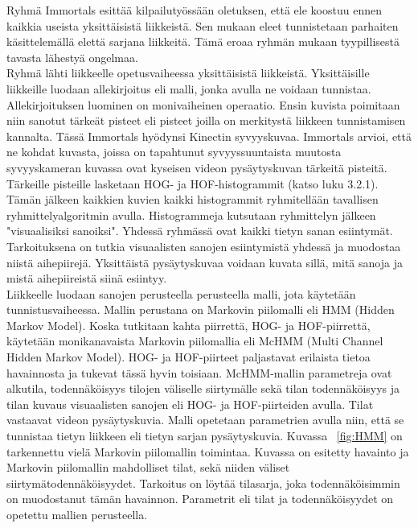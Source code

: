 Ryhmä Immortals esittää kilpailutyössään oletuksen, että ele koostuu ennen kaikkia useista yksittäisistä liikkeistä. 
Sen mukaan eleet tunnistetaan parhaiten käsittelemällä elettä sarjana liikkeitä. Tämä eroaa ryhmän mukaan tyypillisestä 
tavasta lähestyä ongelmaa. \citep {6239185}\\

Ryhmä lähti liikkeelle opetusvaiheessa yksittäisistä liikkeistä. Yksittäisille liikkeille luodaan allekirjoitus eli malli,
jonka avulla ne voidaan tunnistaa. Allekirjoituksen luominen on monivaiheinen operaatio. Ensin kuvista poimitaan niin sanotut
tärkeät pisteet eli pisteet joilla on merkitystä liikkeen tunnistamisen kannalta. Tässä Immortals hyödynsi Kinectin syvyyskuvaa.
Immortals arvioi, että ne kohdat kuvasta, joissa on tapahtunut syvyyssuuntaista muutosta syvyyskameran kuvassa ovat kyseisen videon pysäytyskuvan
tärkeitä pisteitä. Tärkeille pisteille lasketaan HOG- ja HOF-histogrammit (katso luku 3.2.1). 
Tämän jälkeen kaikkien kuvien kaikki histogrammit ryhmitellään tavallisen ryhmittelyalgoritmin avulla.
Histogrammeja kutsutaan ryhmittelyn jälkeen "visuaalisiksi sanoiksi". Yhdessä ryhmässä ovat kaikki tietyn sanan esiintymät.
Tarkoituksena on tutkia visuaalisten sanojen esiintymistä yhdessä ja muodostaa niistä aihepiirejä. 
Yksittäistä pysäytyskuvaa voidaan kuvata sillä, mitä sanoja ja mistä aihepiireistä siinä esiintyy. \citep {6239185}\\

Liikkeelle luodaan sanojen perusteella perusteella malli, jota käytetään tunnistusvaiheessa. Mallin perustana on Markovin piilomalli
eli HMM (Hidden Markov Model). Koska tutkitaan kahta piirrettä, HOG- ja HOF-piirrettä, käytetään monikanavaista Markovin piilomallia
 eli McHMM (Multi Channel Hidden Markov Model). HOG- ja HOF-piirteet paljastavat erilaista tietoa havainnosta ja tukevat tässä hyvin toisiaan. 
 McHMM-mallin parametreja ovat alkutila, todennäköisyys tilojen väliselle siirtymälle sekä tilan todennäköisyys ja tilan kuvaus visuaalisten 
 sanojen eli HOG- ja HOF-piirteiden avulla. Tilat vastaavat videon pysäytyskuvia. Malli opetetaan parametrien avulla niin, että se 
 tunnistaa tietyn liikkeen eli tietyn sarjan pysäytyskuvia.\citep {6239185} Kuvassa ~\ref{fig:HMM} on tarkennettu vielä Markovin piilomallin toimintaa. 
 Kuvassa on esitetty havainto ja Markovin piilomallin mahdolliset tilat, sekä niiden väliset siirtymätodennäköisyydet. Tarkoitus on löytää
tilasarja, joka todennäköisimmin on muodostanut tämän havainnon. Parametrit eli tilat ja todennäköisyydet on opetettu mallien perusteella. \\


